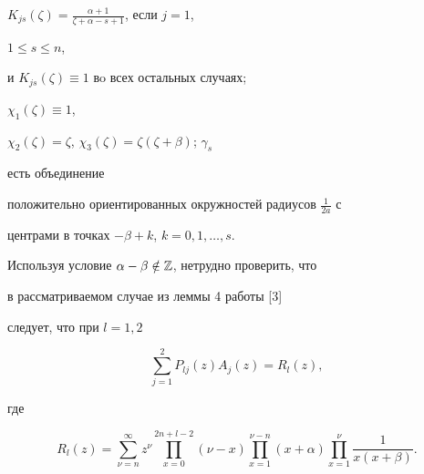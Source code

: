 $K_{js}(\zeta)=\frac{\alpha+1}{\zeta+\alpha-s+1}$, если $j=1$, 


$1\le s\le n$, 


и $K_{js}(\zeta)\equiv1$ вo всех остальных случаях; 


$\chi_1(\zeta)\equiv1$, 


$\chi_2(\zeta)=\zeta$, $\chi_3(\zeta)=\zeta(\zeta+\beta)$; $\gamma_s$ 


есть объединение 


положительно ориентированных окружностей радиусов $\frac{1}{2a}$ с 


центрами в точках $-\beta+k$, $k=0,1,\dotsc,s$. 


 


Используя условие $\alpha-\beta\notin\Bbb Z$, нетрудно проверить, что 


в рассматриваемом случае из леммы 4 работы [3] 


следует, что при $l=1,2$ 


\begin{equation} 


\sum^2_{j=1}P_{lj}(z)A_j(z)=R_l(z), 


\end{equation} 


где 


\begin{equation} 


R_l(z)=\sum^\infty_{\nu=n}z^\nu\prod^{2n+l-2}_{x=0} 


(\nu-x)\prod^{\nu-n}_{x=1}(x+\alpha) 


\prod^\nu_{x=1}\frac{1}{x(x+\beta)}. 


\end{equation} 


 


